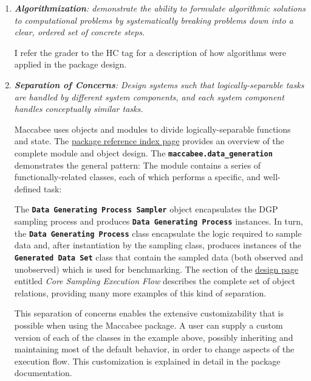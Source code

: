 \documentclass[../main.tex]{subfiles}
\begin{document}
\begin{enumerate}
    \item \textit{\textbf{Algorithmization}: demonstrate the ability to formulate algorithmic solutions to computational problems by systematically breaking problems down into a clear, ordered set of concrete steps.}
    
    I refer the grader to the  HC tag for a description of how algorithms were applied in the package design.
    
    \item \textit{\textbf{Separation of Concerns}: Design systems such that logically-separable tasks are handled by different system components, and each system component handles conceptually similar tasks.}
    
    Maccabee uses objects and modules to divide logically-separable functions and state. The \href{\RTDurl/reference.html}{package reference index page} provides an overview of the complete module and object design. The \textbf{\lstinline{maccabee.data_generation}} demonstrates the general pattern: The module contains a series of functionally-related classes, each of which performs a specific, and well-defined task:
    
    
    \begin{displayquote}
    The \textbf{\texttt{Data Generating Process Sampler}} object encapsulates the DGP sampling process and produces \textbf{\texttt{Data Generating Process}} instances. In turn, the \textbf{\texttt{Data Generating Process}} class encapsulate the logic required to sample data and, after instantiation by the sampling class, produces instances of the \textbf{\texttt{Generated Data Set}} class that contain the sampled data (both observed and unobserved) which is used for benchmarking. The section of the \href{\RTDurl/design.html}{design page} entitled \textit{Core Sampling Execution Flow} describes the complete set of object relations, providing many more examples of this kind of separation.
    \end{displayquote}
    
    This separation of concerns enables the extensive customizability that is possible when using the Maccabee package. A user can supply a custom version of each of the classes in the example above, possibly inheriting and maintaining most of the default behavior, in order to change aspects of the execution flow. This customization is explained in detail in the package documentation.
    

\end{enumerate}
\end{document}
